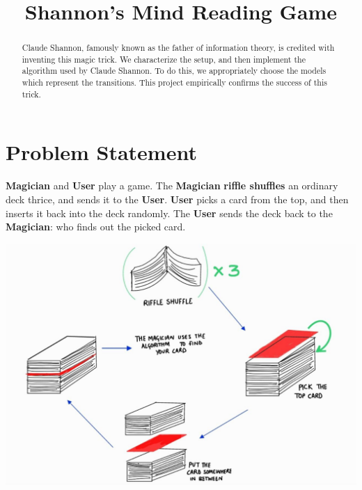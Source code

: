 \documentclass[a4paper]{article}
\date{}
\title{Shannon's Mind Reading Game}
\begin{document}

\pagestyle{fancy}
\maketitle
\author{}
\date{}
\begin{abstract}
    Claude Shannon, famously known as the father of 
    information theory, is credited with inventing this magic trick.
    We characterize the setup, and then implement the algorithm 
    used by Claude Shannon. To do this, 
    we appropriately choose the models which represent the 
    transitions. This project empirically confirms the success of this
    trick.
\end{abstract}
\section{Problem Statement}
\textbf{Magician} and \textbf{User} play a game. The \textbf{Magician} \textbf{riffle shuffles} an ordinary deck thrice, and sends it to the \textbf{User}.
\textbf{User} picks a card from the top, and then inserts 
it back into the deck randomly. The \textbf{User} sends the deck back to the \textbf{Magician}: who finds out 
the picked card.
\begin{center}
    \includegraphics*[width=500pt]{files/Setup.jpg}
\end{center}
\newpage
\end{document}
